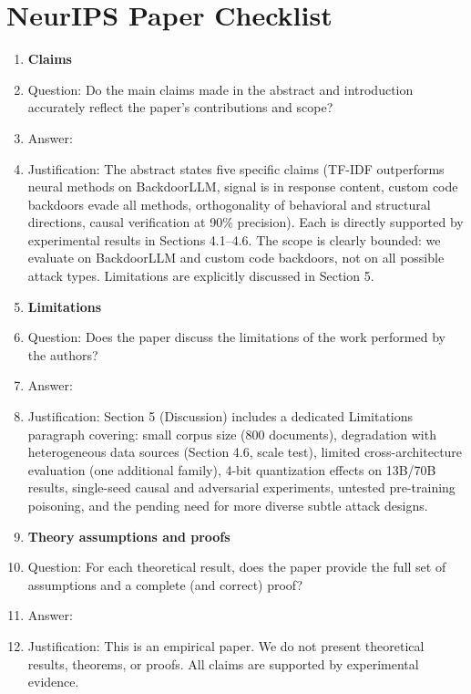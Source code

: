 \section*{NeurIPS Paper Checklist}

\begin{enumerate}

\item {\bf Claims}
    \item[] Question: Do the main claims made in the abstract and introduction accurately reflect the paper's contributions and scope?
    \item[] Answer: \answerYes{}
    \item[] Justification: The abstract states five specific claims (TF-IDF outperforms neural methods on BackdoorLLM, signal is in response content, custom code backdoors evade all methods, orthogonality of behavioral and structural directions, causal verification at 90\% precision). Each is directly supported by experimental results in Sections 4.1--4.6. The scope is clearly bounded: we evaluate on BackdoorLLM and custom code backdoors, not on all possible attack types. Limitations are explicitly discussed in Section 5.

\item {\bf Limitations}
    \item[] Question: Does the paper discuss the limitations of the work performed by the authors?
    \item[] Answer: \answerYes{}
    \item[] Justification: Section 5 (Discussion) includes a dedicated Limitations paragraph covering: small corpus size (800 documents), degradation with heterogeneous data sources (Section 4.6, scale test), limited cross-architecture evaluation (one additional family), 4-bit quantization effects on 13B/70B results, single-seed causal and adversarial experiments, untested pre-training poisoning, and the pending need for more diverse subtle attack designs.

\item {\bf Theory assumptions and proofs}
    \item[] Question: For each theoretical result, does the paper provide the full set of assumptions and a complete (and correct) proof?
    \item[] Answer: \answerNA{}
    \item[] Justification: This is an empirical paper. We do not present theoretical results, theorems, or proofs. All claims are supported by experimental evidence.


\end{enumerate}
